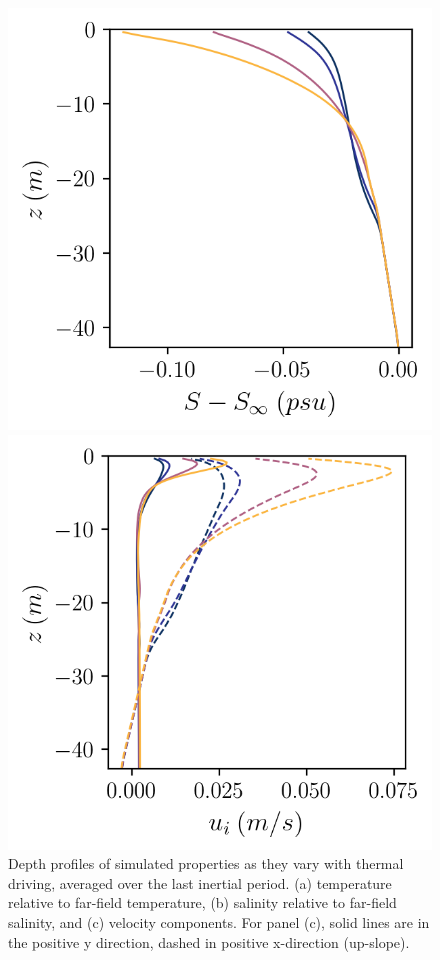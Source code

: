 \documentclass[draft]{agujournal2019}
\begin{document}
\begin{figure}[h!]
\begin{minipage}{0.33\textwidth}
        \includegraphics[trim={0 0cm 0 0},clip, width=\textwidth]{Figures/sa_cmp_dT_43h_tav13h_z_profile.png}
    \end{minipage}%
    \begin{minipage}{0.33\textwidth}
        \includegraphics[trim={0 0cm 0 0},clip, width=\textwidth]{Figures/velocity_cmp_dT_43h_tav13h_z_profile.png}
    \end{minipage}
    \caption{Depth profiles of simulated properties as they vary with thermal driving, averaged over the last inertial period. (a) temperature relative to far-field temperature, (b) salinity relative to far-field salinity, and (c) velocity components. For panel (c), solid lines are in the positive y direction, dashed in positive x-direction (up-slope).}
    \label{fig:dT_profiles}
\end{figure}
\end{document}
